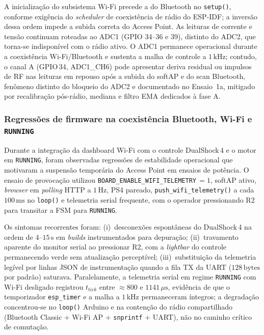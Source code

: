 A inicialização do subsistema Wi-Fi precede a do Bluetooth no \texttt{setup()}, conforme exigência do \textit{scheduler} de coexistência de rádio do ESP-IDF; a inversão dessa ordem impede a subida correta do Access Point. As leituras de corrente e tensão continuam roteadas ao ADC1 (GPIO 34--36 e 39), distinto do ADC2, que torna-se indisponível com o rádio ativo. O ADC1 permanece operacional durante a coexistência Wi-Fi/Bluetooth e sustenta a malha de controle a $1\,\text{kHz}$; contudo, o canal A (GPIO\,34, ADC1\_CH6) pode apresentar deriva residual ou impulsos de RF nas leituras em repouso após a subida do softAP e do scan Bluetooth, fenômeno distinto do bloqueio do ADC2 e documentado no Ensaio~1a, mitigado por recalibração pós-rádio, mediana e filtro EMA dedicados à fase A.

\subsubsection{Regressões de firmware na coexistência Bluetooth, Wi-Fi e \texttt{RUNNING}}
\label{subsubsec:bugs_coexistencia_radio}

Durante a integração da dashboard Wi-Fi com o controle DualShock\,4 e o motor em \texttt{RUNNING}, foram observadas regressões de estabilidade operacional que motivaram a suspensão temporária do Access Point em ensaios de potência. O ensaio de provocação utilizou \texttt{BOARD\_ENABLE\_WIFI\_TELEMETRY}\,$= 1$, softAP ativo, \textit{browser} em \textit{polling} HTTP a $1\,\text{Hz}$, PS4 pareado, \texttt{push\_wifi\_telemetry()} a cada $100\,\text{ms}$ no \texttt{loop()} e telemetria serial frequente, com o operador pressionando R2 para transitar a FSM para \texttt{RUNNING}.

Os sintomas recorrentes foram: (i)~desconexões espontâneas do DualShock\,4 na ordem de $4$--$15\,\text{s}$ em \textit{builds} instrumentados para depuração; (ii)~travamento aparente do monitor serial ao pressionar R2, com a \textit{lightbar} do controle permanecendo verde sem atualização perceptível; (iii)~substituição da telemetria legível por linhas JSON de instrumentação quando a fila TX da UART ($128\,\text{bytes}$ por padrão) saturava. Paralelamente, a telemetria serial em regime \texttt{RUNNING} com Wi-Fi desligado registrou $t_{tick}$ entre $\approx 800$ e $1141\,\mu\text{s}$, evidência de que o temporizador \texttt{esp\_timer} e a malha a $1\,\text{kHz}$ permaneceram íntegros; a degradação concentrou-se no \texttt{loop()} Arduino e na contenção do rádio compartilhado (Bluetooth Classic + Wi-Fi AP + \texttt{snprintf} + UART), não no caminho crítico de comutação.

